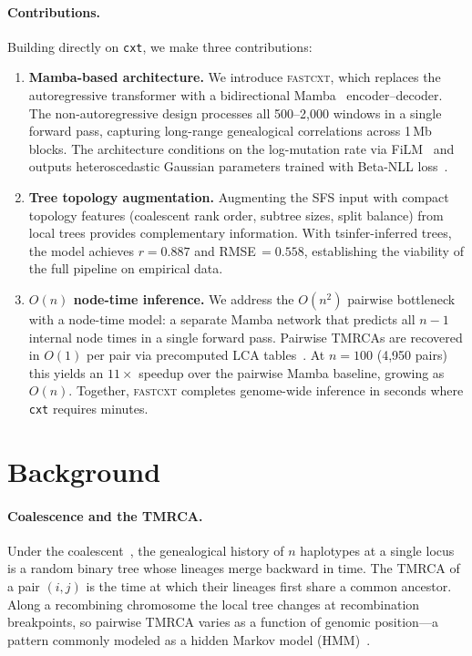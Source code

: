 \documentclass{article}
\begin{document}
\paragraph{Contributions.} Building directly on \texttt{cxt}, we make three contributions:
\begin{enumerate}
  \item \textbf{Mamba-based architecture.} We introduce \textsc{fastcxt}, which replaces the
    autoregressive transformer with a bidirectional
    Mamba~\citep{gu2024mamba, dao2024transformers} encoder--decoder. The non-autoregressive
    design processes all 500--2{,}000 windows in a single forward pass, capturing long-range
    genealogical correlations across 1\,Mb blocks. The architecture conditions on the
    log-mutation rate via FiLM~\citep{perez2018film} and outputs heteroscedastic Gaussian
    parameters trained with Beta-NLL loss~\citep{seitzer2022pitfalls}.
  \item \textbf{Tree topology augmentation.} Augmenting the SFS input with compact topology
    features (coalescent rank order, subtree sizes, split balance) from local trees provides
    complementary information. With tsinfer-inferred trees, the model achieves $r = 0.887$
    and RMSE\,$= 0.558$, establishing the viability of the full pipeline on empirical data.
  \item \textbf{$O(n)$ node-time inference.} We address the $O(n^2)$ pairwise bottleneck
    with a node-time model: a separate Mamba network that predicts all $n - 1$ internal node
    times in a single forward pass. Pairwise TMRCAs are recovered in $O(1)$ per pair via
    precomputed LCA tables~\citep{bender2000lca}. At $n = 100$ (4{,}950 pairs) this yields
    an $11\times$ speedup over the pairwise Mamba baseline, growing as $O(n)$.
    Together, \textsc{fastcxt} completes genome-wide inference in seconds where \texttt{cxt}
    requires minutes.
\end{enumerate}

\section{Background}

\paragraph{Coalescence and the TMRCA.}
Under the coalescent~\citep{kingman1982coalescent}, the genealogical history of $n$ haplotypes
at a single locus is a random binary tree whose lineages merge backward in time. The TMRCA of a
pair $(i,j)$ is the time at which their lineages first share a common ancestor. Along a
recombining chromosome the local tree changes at recombination breakpoints, so pairwise TMRCA
varies as a function of genomic position---a pattern commonly modeled as a hidden Markov model
(HMM)~\citep{li2011inference}.
\end{document}
